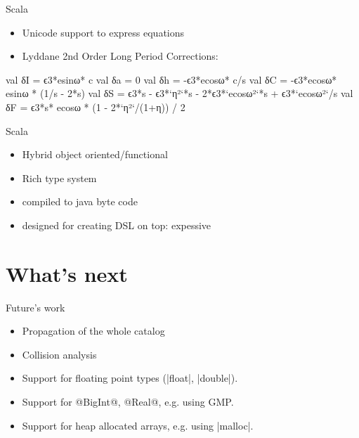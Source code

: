 \documentclass[10pt, compress, xcolor={usenames,dvipsnames}]{beamer}
\newcommand{\SmallArrow}{\ding{228}}
\newcommand{\Triangle}{$\triangleright$\xspace}
\begin{document}
\begin{frame}[fragile]{Scala}

  \begin{itemize}[label=\SmallArrow]
    \item Unicode support to express equations
	\item Lyddane 2nd Order Long Period Corrections:
  \end{itemize}

  \begin{Scala}
val δI =  ϵ3*esinω* c
val δa =  0
val δh = -ϵ3*ecosω* c/s
val δC = -ϵ3*ecosω* esinω * (1/s - 2*s)
val δS =  ϵ3*s - ϵ3*`η²`*s - 2*ϵ3*`ecosω²`*s + ϵ3*`ecosω²`/s
val δF =  ϵ3*s* ecosω * (1 - 2*`η²`/(1+η)) / 2
  \end{Scala}

\end{frame}

\begin{frame}[fragile]{Scala}


  \begin{itemize}[label=\SmallArrow]
    \item Hybrid object oriented/functional 
    \item Rich type system
    \item compiled to java byte code
    \item designed for creating DSL on top: expessive
  \end{itemize}

\end{frame}

\section{What's next}

\begin{frame}[fragile]{Future's work}
  \begin{itemize}[label=\SmallArrow]
    \item Propagation of the whole catalog
    \item Collision analysis
  \end{itemize}

  \vspace{3em}
  \pause

  \begin{itemize}[label=\Triangle]
    \item Support for floating point types (|float|, |double|).
    \item Support for @BigInt@, @Real@, e.g. using GMP.
    \item Support for heap allocated arrays, e.g. using |malloc|.
  \end{itemize}
\end{frame}

\end{document}
